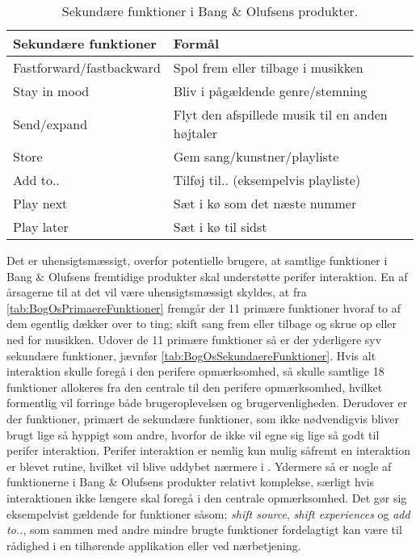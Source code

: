 \noindent
%
%
\begin{table}[H]
	\centering
	\begin{tabular}{ | l | p{8cm} |}
		\hline
		\multicolumn{1}{|l|}{\textbf{Sekundære funktioner}} & \multicolumn{1}{l|}{\textbf{Formål}} \\ \hline
		Fastforward/fastbackward & Spol frem eller tilbage i musikken \\ \hline
		Stay in mood & Bliv i pågældende genre/stemning \\ \hline
		Send/expand & Flyt den afspillede musik til en anden højtaler \\ \hline
		Store & Gem sang/kunstner/playliste \\ \hline
		Add to.. & Tilføj til.. (eksempelvis playliste) \\ \hline
		Play next & Sæt i kø som det næste nummer \\ \hline
		Play later & Sæt i kø til sidst \\ \hline
	\end{tabular}
	\caption{Sekundære funktioner i Bang $\&$ Olufsens produkter.}
	\label{tab:BogOsSekundaereFunktioner}
\end{table}
\noindent
%
Det er uhensigtsmæssigt, overfor potentielle brugere, at samtlige funktioner i Bang $\&$ Olufsens fremtidige produkter skal understøtte perifer interaktion. En af årsagerne til at det vil være uhensigtsmæssigt skyldes, at fra \autoref{tab:BogOsPrimaereFunktioner} fremgår der 11 primære funktioner hvoraf to af dem egentlig dækker over to ting; skift sang frem eller tilbage og skrue op eller ned for musikken. Udover de 11 primære funktioner så er der yderligere syv sekundære funktioner, jævnfør \autoref{tab:BogOsSekundaereFunktioner}. Hvis alt interaktion skulle foregå i den perifere opmærksomhed, så skulle samtlige 18 funktioner allokeres fra den centrale til den perifere opmærksomhed, hvilket formentlig vil forringe både brugeroplevelsen og brugervenligheden. Derudover er der funktioner, primært de sekundære funktioner, som ikke nødvendigvis bliver brugt lige så hyppigt som andre, hvorfor de ikke vil egne sig lige så godt til perifer interaktion. Perifer interaktion er nemlig kun mulig såfremt en interaktion er blevet rutine, hvilket vil blive uddybet nærmere i . Ydermere så er nogle af funktionerne i Bang $\&$ Olufsens produkter relativt komplekse, særligt hvis interaktionen ikke længere skal foregå i den centrale opmærksomhed. Det gør sig eksempelvist gældende for funktioner såsom; \textit{shift source}, \textit{shift experiences} og \textit{add to..}, som sammen med andre mindre brugte funktioner fordelagtigt kan være til rådighed i en tilhørende applikation eller ved nærbetjening.  

